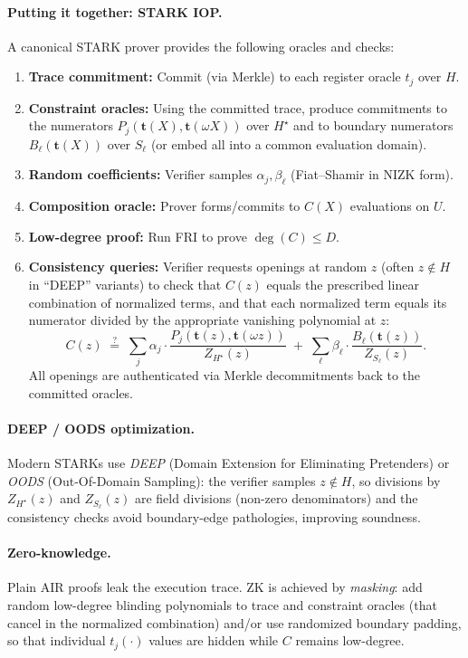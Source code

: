 \paragraph{Putting it together: STARK IOP.}
A canonical STARK prover provides the following oracles and checks:
\begin{enumerate}
  \item \textbf{Trace commitment:} Commit (via Merkle) to each register oracle $t_j$ over $H$.
  \item \textbf{Constraint oracles:} Using the committed trace, produce commitments to the
  numerators $P_j(\mathbf{t}(X),\mathbf{t}(\omega X))$ over $H^\star$ and to boundary numerators $B_\ell(\mathbf{t}(X))$ over $S_\ell$ (or embed all into a common evaluation domain).
  \item \textbf{Random coefficients:} Verifier samples $\alpha_j,\beta_\ell$ (Fiat–Shamir in NIZK form).
  \item \textbf{Composition oracle:} Prover forms/commits to $C(X)$ evaluations on $U$.
  \item \textbf{Low-degree proof:} Run FRI to prove $\deg(C)\le D$.
  \item \textbf{Consistency queries:} Verifier requests openings at random $z$ (often $z\notin H$ in “DEEP” variants)
  to check that $C(z)$ equals the prescribed linear combination of normalized terms, and that each normalized term
  equals its numerator divided by the appropriate vanishing polynomial at $z$:
  \[
    C(z)\;\stackrel{?}{=}\;\sum_{j}\alpha_j \cdot
      \frac{P_j(\mathbf{t}(z),\mathbf{t}(\omega z))}{Z_{H^\star}(z)}
    \;+\; \sum_{\ell}\beta_\ell\cdot \frac{B_\ell(\mathbf{t}(z))}{Z_{S_\ell}(z)}.
  \]
  All openings are authenticated via Merkle decommitments back to the committed oracles.
\end{enumerate}

\paragraph{DEEP / OODS optimization.}
Modern STARKs use \emph{DEEP} (Domain Extension for Eliminating Pretenders)
or \emph{OODS} (Out-Of-Domain Sampling): the verifier samples $z\notin H$,
so divisions by $Z_{H^\star}(z)$ and $Z_{S_\ell}(z)$ are field divisions (non-zero denominators) and the
consistency checks avoid boundary-edge pathologies, improving soundness.

\paragraph{Zero-knowledge.}
Plain AIR proofs leak the execution trace. ZK is achieved by \emph{masking}:
add random low-degree blinding polynomials to trace and constraint oracles (that
cancel in the normalized combination) and/or use randomized boundary padding,
so that individual $t_j(\cdot)$ values are hidden while $C$ remains low-degree.

